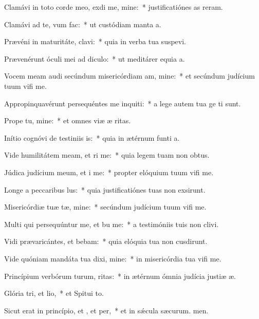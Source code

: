 \item Clamávi in toto corde meo, exdi me, mine:~* justificatiónes as reram.
\item Clamávi ad te, vum  fac:~* ut custódiam manta a.
\item Prævéni in maturitáte,  clavi:~* quia in verba tua suspevi.
\item Prævenérunt óculi mei ad  diculo:~* ut meditárer equia a.
\item Vocem meam audi secúndum misericórdiam am, mine:~* et secúndum judícium tuum vifi me.
\item Appropinquavérunt persequéntes me inquiti:~* a lege autem tua ge ti sunt.
\item Prope  tu, mine:~* et omnes viæ æ ritas.
\item Inítio cognóvi de testiniis is:~* quia in ætérnum funti a.
\item Vide humilitátem meam, et ri me:~* quia legem tuam non  obtus.
\item Júdica judícium meum, et i me:~* propter elóquium tuum vifi me.
\item Longe a peccaribus lus:~* quia justificatiónes tuas non exsirunt.
\item Misericórdiæ tuæ tæ, mine:~* secúndum judícium tuum vifi me.
\item Multi qui persequúntur me, et bu me:~* a testimóniis tuis non clivi.
\item Vidi prævaricántes, et bebam:~* quia elóquia tua non cusdirunt.
\item Vide quóniam mandáta tua dixi, mine:~* in misericórdia tua vifi me.
\item Princípium verbórum turum, ritas:~* in ætérnum ómnia judícia justiæ æ.
\item Glória tri, et lio,~* et Spitui to.
\item Sicut erat in princípio, et , et per,~* et in sǽcula sæcurum. men.
